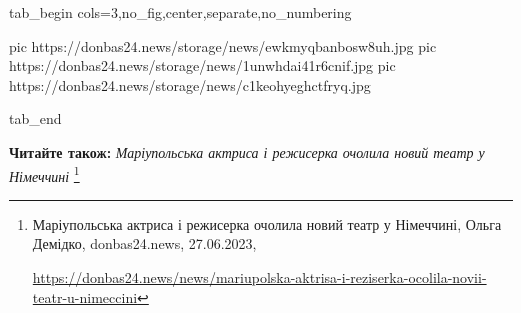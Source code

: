\ifcmt
  tab_begin cols=3,no_fig,center,separate,no_numbering

     pic https://donbas24.news/storage/news/ewkmyqbanbosw8uh.jpg
		 pic https://donbas24.news/storage/news/1unwhdai41r6cnif.jpg
		 pic https://donbas24.news/storage/news/c1keohyeghctfryq.jpg

  tab_end
\fi

\textbf{Читайте також:} \emph{Маріупольська актриса і режисерка очолила новий театр у Німеччині}%
\footnote{Маріупольська актриса і режисерка очолила новий театр у Німеччині, Ольга Демідко, donbas24.news, 27.06.2023, \par%
\url{https://donbas24.news/news/mariupolska-aktrisa-i-reziserka-ocolila-novii-teatr-u-nimeccini}
}


